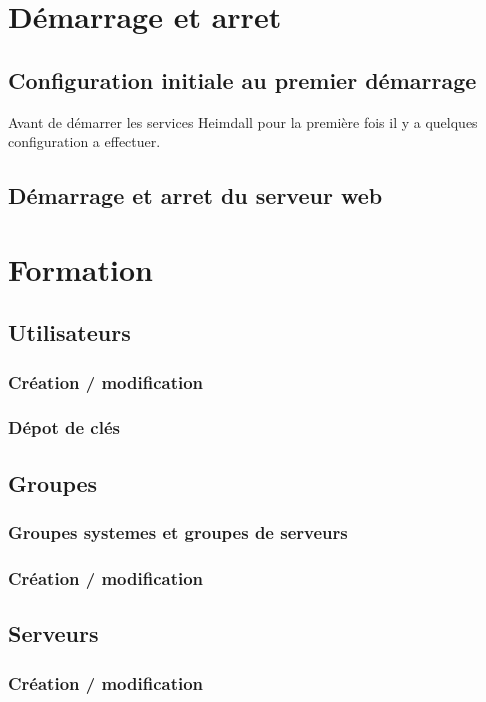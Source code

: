 \documentclass[11pt]{template}
\begin{document}
\newpage
\section{Démarrage et arret}
\subsection{Configuration initiale au premier démarrage}
Avant de démarrer les services Heimdall pour la première fois il y a quelques configuration a effectuer.\\

\subsection{Démarrage et arret du serveur web}

\newpage
\section{Formation}
\subsection{Utilisateurs}
\subsubsection{Création / modification}
\subsubsection{Dépot de clés}

\subsection{Groupes}
\subsubsection{Groupes systemes et groupes de serveurs}
\subsubsection{Création / modification}

\subsection{Serveurs}
\subsubsection{Création / modification}
\end{document}
